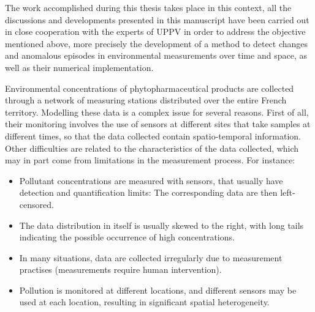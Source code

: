 The work accomplished during this thesis takes place in this context, all the discussions and developments presented in this manuscript have been carried out in close cooperation with the experts of UPPV in order to address the objective mentioned above, more precisely the development of a method to detect changes and anomalous episodes in environmental measurements over time and space, as well as their numerical implementation.

Environmental concentrations of phytopharmaceutical products are collected through a network of measuring stations distributed over the entire French territory.  Modelling these data is a complex issue for several reasons. First of all, their monitoring involves the use of sensors at different sites that take samples at different times, so that the data collected contain spatio-temporal information. Other difficulties are related to the characteristics of the data collected, which may in part come from limitations in the measurement process. For instance: 
\begin{itemize}
\item Pollutant concentrations are measured with sensors, that usually have detection and quantification limits: The corresponding data are then left-censored.
\item The data distribution in itself is usually skewed to the right, with long tails indicating the  possible occurrence of high concentrations.
\item In many situations, data are collected irregularly due to measurement practises (measurements require human intervention).
\item Pollution is monitored at different locations, and different sensors may be used at each location, resulting in significant spatial heterogeneity.
\end{itemize}



